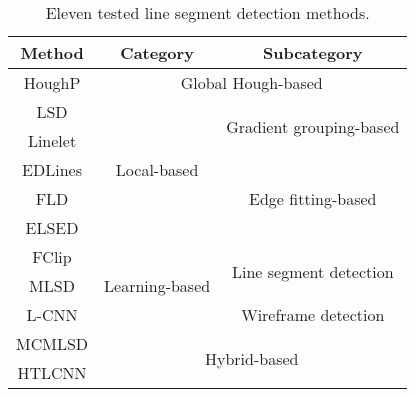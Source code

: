\documentclass[journal,compsoc]{IEEEtran}
\begin{document}
\begin{table}[tbp] 	
	\centering 	
	\scriptsize 	
	\caption{Eleven tested line segment detection methods.} 	
	\begin{tabular}{|c|cc|} 		\hline 		Method  & \multicolumn{1}{c|}{Category}                        & Subcategory                              \\ 
		\hline 		HoughP \cite{RobustDetectionofLinesUsingtheProgressiveProbabilisticHoughTransform} & \multicolumn{2}{c|}{Global Hough-based}                                                         \\ \hline 		LSD \cite{LSD}    & \multicolumn{1}{c|}{\multirow{5}{*}{Local-based}}    & \multirow{2}{*}{Gradient grouping-based} \\ \cline{1-1} 		Linelet \cite{ANovelLineletBasedRepresentationforLineSegmentDetection} & \multicolumn{1}{c|}{}                                &                                          \\ \cline{1-1} \cline{3-3}  		EDLines \cite{EDLines} & \multicolumn{1}{c|}{}                                & \multirow{3}{*}{Edge fitting-based}      \\ \cline{1-1} 		FLD \cite{Outdoorplacerecognitioninurbanenvironmentsusingstraightlines}     & \multicolumn{1}{c|}{}                                &                                          \\ \cline{1-1} 		ELSED \cite{ELSED}   & \multicolumn{1}{c|}{}                                &                                          \\ \hline 		FClip \cite{FullyConvolutionalLineParsing}   & \multicolumn{1}{c|}{\multirow{3}{*}{Learning-based}} & \multirow{2}{*}{Line segment detection}  \\ \cline{1-1} 		MLSD \cite{TowardsRealtimeandLightweightLineSegmentDetection}    & \multicolumn{1}{c|}{}                                &                                          \\ \cline{1-1} \cline{3-3}  		L-CNN \cite{End-to-EndWireframeParsing}  & \multicolumn{1}{c|}{}                                & Wireframe detection                      \\ \hline 		MCMLSD \cite{MCMLSD} & \multicolumn{2}{c|}{\multirow{2}{*}{Hybrid-based}}                                              \\ \cline{1-1} 		HTLCNN \cite{DeepHoughTransformLinePriors} & \multicolumn{2}{c|}{}                                                                           \\ \hline 	
	\end{tabular} 	
	\label{test_detection_methods} 
\end{table}
\end{document}
